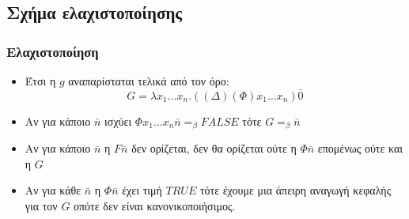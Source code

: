 \documentclass{beamer}
\begin{document}
\subsection{Σχήμα ελαχιστοποίησης}
\begin{frame}
        \frametitle{Ελαχιστοποίηση}
        \begin{itemize}
          \item Έτσι η $g$ αναπαρίσταται τελικά από τον όρο:
            $$G = \lambda x_1 \ldots x_n . ((\Delta) (\Phi) x_1 \ldots x_n) \bar{0}$$
          \pause
          \item Αν για κάποιο $\bar{n}$ ισχύει $\Phi x_1 \ldots x_n \bar{n}=_\beta FALSE$ τότε $G =_\beta\bar{n}$
          \pause
          \item Αν για κάποιο $\bar{n}$ η $F \bar{n}$ δεν ορίζεται, δεν θα ορίζεται 
          	    ούτε η $\Phi \bar{n}$ επομένως ούτε και η $G$
          \pause
          \item Αν για κάθε $\bar{n}$ η $\Phi \bar{n}$ έχει τιμή $TRUE$ τότε έχουμε
                μια άπειρη αναγωγή κεφαλής για τον $G$ οπότε δεν είναι κανονικοποιήσιμος.
        \end{itemize}
\end{frame}

\end{document}
